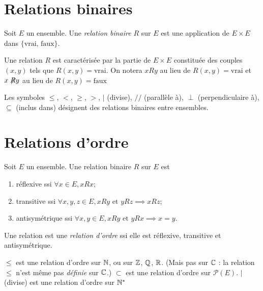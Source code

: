 \section{Relations binaires}

\begin{definition} Soit $E$ un ensemble. Une \emph{relation binaire} $R$ sur $E$ est une application de $E\times E$ dans $\{\text{vrai, faux}\}$.
\end{definition}

Une relation $R$ est caractérisée par la partie de $E\times E$ constituée des couples $(x,y)$ tels que $R(x,y)=\text{vrai}$. On notera \og$xRy$\fg{} au lieu de \og$R(x,y)=\text{vrai}$\fg{} et \og$x\not \hspace{-.1cm}R y$\fg{} au lieu de \og$R(x,y)=\text{faux}$\fg{}

\begin{exemples} Les symboles $\leq$, $<$, $\geq$, $>$, $|$ (divise), $//$ (parallèle à), $\perp$ (perpendiculaire à), $\subseteq$ (inclus dans) désignent des relations binaires entre ensembles.
\end{exemples}

\section{Relations d'ordre}

\begin{definition}
Soit $E$ un ensemble. Une relation binaire $R$ sur $E$ est
\begin{enumerate}
\item réflexive ssi $\forall x\in E, xRx$;
\item transitive ssi $\forall x, y, z\in E, xRy \text{ et } yRz \implies xRz$;
\item antisymétrique ssi $\forall x, y \in E, xRy\text{ et } yRx \implies x=y$.
\end{enumerate}

Une relation est une \emph{relation d'ordre} ssi elle est réflexive, transitive et antisymétrique.
\end{definition}

\begin{exemples}
$\leq$ est une relation d'ordre sur $\mathbb{N}$, ou sur $\mathbb{Z}$, $\mathbb{Q}$, $\mathbb{R}$. (Mais pas sur $\mathbb{C}$ : la relation $\leq$ n'est même pas \emph{définie} sur $\mathbb{C}$.)
$\subset$ est une relation d'ordre sur $\mathcal P(E)$.
$|$ (\og divise\fg) est une relation d'ordre sur $\mathbb{N}^*$
\end{exemples}


